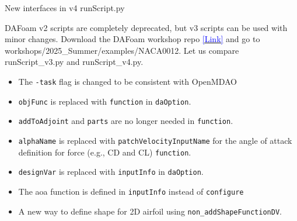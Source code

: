 \documentclass{bredelebeamer}
\begin{document}
\begin{frame}{New interfaces in v4 runScript.py}



DAFoam v2 scripts are completely deprecated, but v3 scripts can be used with minor changes. Download the DAFoam workshop repo \href{https://github.com/DAFoam/workshops}{\textcolor{blue}{[Link]}} and go to workshops/2025\_Summer/examples/NACA0012. Let us compare runScript\_v3.py and runScript\_v4.py.

\begin{itemize}

  \item The \texttt{-task} flag is changed to be consistent with OpenMDAO
  \item \texttt{objFunc} is replaced with \texttt{function} in \texttt{daOption}.
  \item \texttt{addToAdjoint} and \texttt{parts} are no longer needed in \texttt{function}.
  \item \texttt{alphaName} is replaced with \texttt{patchVelocityInputName} for the angle of attack definition for force (e.g., CD and CL) \texttt{function}.
  \item \texttt{designVar} is replaced with \texttt{inputInfo} in \texttt{daOption}.
  \item The aoa function is defined in \texttt{inputInfo} instead of \texttt{configure}
  \item A new way to define shape for 2D airfoil using \texttt{non\_addShapeFunctionDV}.
\end{itemize}

\end{frame}
\end{document}
